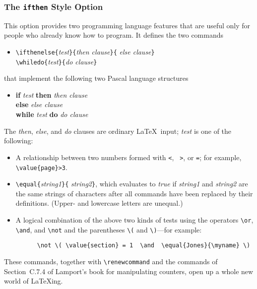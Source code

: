 \subsubsection{The \mbox{\tt ifthen} Style Option}
\label{se:ifthensty}

This option provides two programming language features that are useful
only for people who already know how to program.  It defines the
two commands
\begin{itemize} 
\item[]
\verb|\ifthenelse{|{\em test\/}\verb|}{|{\em then clause\/}\verb|}{|%
{\em else clause\/}\verb|}|\\
\verb|\whiledo{|{\em test\/}\verb|}{|{\em do clause\/}\verb|}|
\end{itemize}
that implement the following two Pascal language structures
\begin{itemize}
\item[]
\begin{tabbing}
{\bf if} {\em test\/} \= {\bf then} \= {\em then clause\/} \\
 \> {\bf else} \> {\em else clause\/} \\[2pt]
{\bf while} {\em test\/} {\bf do} {\em do clause\/}
\end{tabbing}
\end{itemize}
The {\em then\/}, {\em else\/}, and {\em do\/} clauses
are ordinary \LaTeX\ input; {\em test\/} is one of the following:
\begin{itemize}
 \item A relationship between two numbers formed with \mbox{\tt <}, \mbox{\tt
>}, or \mbox{\tt =}; for example, \hbox{\verb|\value{page}>3|}. 
\item \verb|\equal{|{\em string1\/}\verb|}{|%
{\em string2\/}\verb|}|, which evaluates to {\em true\/} if {\em
string1\/} and {\em string2\/} are the same strings of characters after
all commands have been replaced by their definitions.  (Upper- and
lowercase letters are unequal.)
 \item A logical combination of the above two kinds of tests
    using the operators \hbox{\verb|\or|}, \hbox{\verb|\and|},
    and \hbox{\verb|\not|} and the parentheses \hbox{\verb|\(|}
    and \hbox{\verb|\)|}---for example:
\begin{verbatim}
      \not \( \value{section} = 1  \and  \equal{Jones}{\myname} \)
\end{verbatim}
\end{itemize}
These commands, together with \hbox{\verb|\renewcommand|} and the
commands of Section~C.7.4 of Lamport's book for manipulating counters, open 
up a whole new world of \LaTeX ing.

